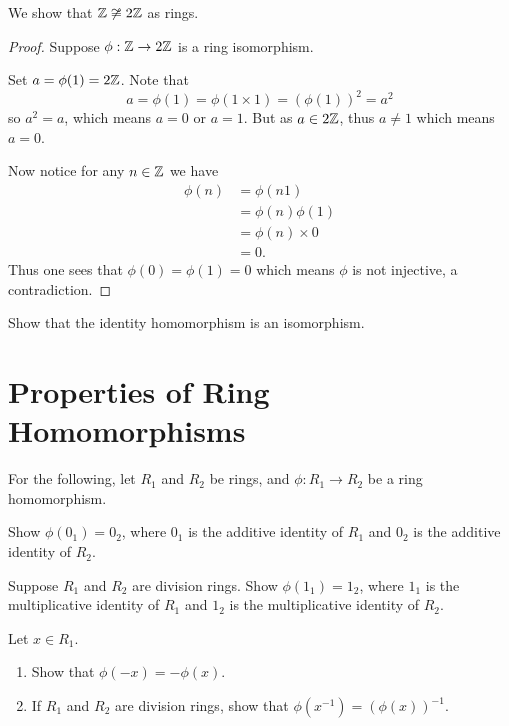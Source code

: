 \begin{example}
    We show that $\mathbb{Z} \not\cong 2\mathbb{Z}$ as rings.

    \begin{proof}
        Suppose $\phi: \mathbb{Z} \to 2\mathbb{Z}$ is a ring isomorphism.

        Set $a = \phi(1) = 2\mathbb{Z}$. Note that
        \[
            a = \phi(1) = \phi(1\times1) = (\phi(1))^2 = a^2
        \]
        so $a^2 = a$, which means $a = 0$ or $a = 1$. But as $a \in 2\mathbb{Z}$, thus $a \neq 1$ which means $a = 0$.

        Now notice for any $n \in \mathbb{Z}$ we have
        \begin{align*}
            \phi(n) &= \phi(n1)\\
            &= \phi(n)\phi(1)\\
            &= \phi(n) \times 0\\
            &= 0.
        \end{align*}
        Thus one sees that $\phi(0) = \phi(1) = 0$ which means $\phi$ is not injective, a contradiction.
    \end{proof}
\end{example}
\begin{exercise}
    Show that the identity homomorphism is an isomorphism.
\end{exercise}

\section{Properties of Ring Homomorphisms}
For the following, let $R_1$ and $R_2$ be rings, and $\phi: R_1 \to R_2$ be a ring homomorphism.

\begin{exercise}\label{exercise-image-of-additive-identity-is-additive-identity}
    Show $\phi(0_1) = 0_2$, where $0_1$ is the additive identity of $R_1$ and $0_2$ is the additive identity of $R_2$.
\end{exercise}

\begin{exercise}
    Suppose $R_1$ and $R_2$ are division rings. Show $\phi(1_1) = 1_2$, where $1_1$ is the multiplicative identity of $R_1$ and $1_2$ is the multiplicative identity of $R_2$.
\end{exercise}

\begin{exercise}
    Let $x \in R_1$.
    \begin{enumerate}[label=(\alph*)]
        \item Show that $\phi(-x) = -\phi(x)$.
        \item If $R_1$ and $R_2$ are division rings, show that $\phi(x^{-1}) = (\phi(x))^{-1}$.
    \end{enumerate}
\end{exercise}

